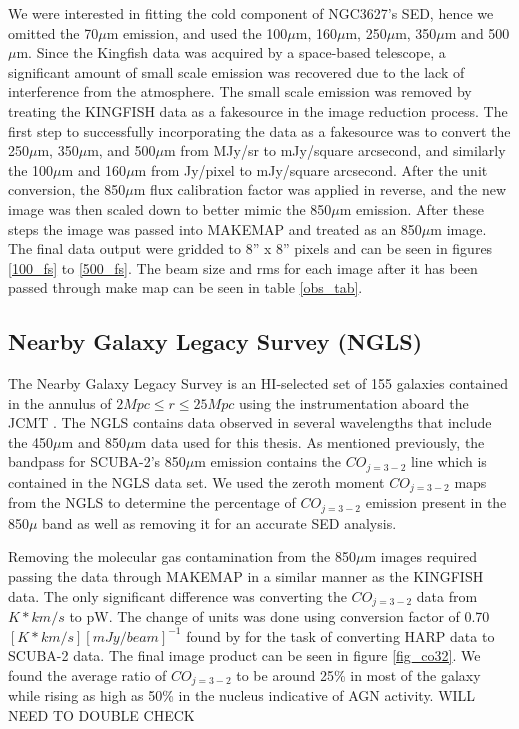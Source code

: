 We were interested in fitting the cold component of NGC3627's SED, hence we omitted the 70$\mu$m emission, and used the 100$\mu$m, 160$\mu$m, 250$\mu$m, 350$\mu$m and 500$\mu$m.  Since the Kingfish data was acquired by a space-based telescope, a significant amount of small scale emission was recovered due to the lack of interference from the atmosphere.  The small scale emission was removed by treating the KINGFISH data as a fakesource in the image reduction process.  The first step to successfully incorporating the data as a fakesource was to convert the 250$\mu$m, 350$\mu$m, and 500$\mu$m from MJy/sr to mJy/square arcsecond, and similarly the 100$\mu$m and 160$\mu$m from Jy/pixel to mJy/square arcsecond.   After the unit conversion, the 850$\mu$m flux calibration factor was applied in reverse, and the new image was then scaled down to better mimic the 850$\mu$m emission.  After these steps the image was passed into MAKEMAP and treated as an 850$\mu$m image.  The final data output were gridded to 8'' x 8'' pixels and can be seen in figures \ref{100_fs} to \ref{500_fs}.  The beam size and rms for each image after it has been passed through make map can be seen in table \ref{obs_tab}.


\subsection{Nearby Galaxy Legacy Survey (NGLS)}

The Nearby Galaxy Legacy Survey is an HI-selected set of 155 galaxies contained in the annulus of $2Mpc\leq r \leq25Mpc$ using the instrumentation aboard the JCMT \protect\citet{wilson2012}.  The NGLS contains data observed in several wavelengths that include the 450$\mu$m and 850$\mu$m data used for this thesis.  As mentioned previously, the bandpass for SCUBA-2's 850$\mu$m emission contains the $CO_{j=3-2}$ line which is contained in the NGLS data set.  We used the zeroth moment $CO_{j=3-2}$ maps from the NGLS to determine the percentage of $CO_{j=3-2}$ emission present in the 850$\mu$ band as well as removing it for an accurate SED analysis.  

Removing the molecular gas contamination from the 850$\mu$m images required passing the data through MAKEMAP in a similar manner as the KINGFISH data.  The only significant difference was converting the $CO_{j=3-2}$ data from $K*km/s$ to pW.  The change of units was done using conversion factor of 0.70 $[K*km/s][mJy/beam]^{-1}$ found by \protect\citet{drabek2012} for the task of converting HARP data to SCUBA-2 data.  The final image product can be seen in figure \ref{fig_co32}.  We found the average ratio of $CO_{j=3-2}$ to be around 25\% in most of the galaxy while rising as high as 50\% in the nucleus indicative of AGN activity.  WILL NEED TO DOUBLE CHECK

